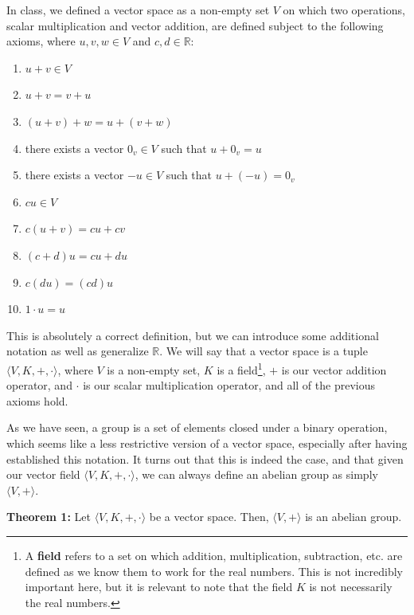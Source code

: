 \documentclass[twoside]{article}
\newcommand{\R}{\mathbb{R}}
\begin{document}
\begin{spacing}{1.25}
In class, we defined a vector space as a non-empty set $V$ on which two operations,
scalar multiplication and vector addition, are defined subject to the following axioms,
where $u,v,w \in V$ and $c,d \in \R$:
\begin{enumerate}
    \item $u+v \in V$
    \item $u+v = v+u$
    \item $(u+v)+w = u+(v+w)$
    \item there exists a vector $0_v \in V$ such that $u+0_v = u$
    \item there exists a vector $-u \in V$ such that $u+(-u) = 0_v$
    \item $cu\in V$
    \item $c(u+v) = cu+cv$
    \item $(c+d)u = cu+du$
    \item $c(du) = (cd)u$
    \item $1 \cdot u = u$
\end{enumerate}
This is absolutely a correct definition, but we can introduce some additional 
notation as well as generalize $\R$. We will say that a vector space is a tuple 
$\langle V, K, +, \cdot \rangle$, where $V$ is a non-empty set, $K$ is a field\footnote[2]{A \textbf{field} refers to a set on which addition, multiplication, subtraction, etc. are defined as we know them to work for the real numbers. This is not incredibly important here, but it is relevant to note that the field $K$ is not necessarily the real numbers.},
$+$ is our vector addition operator, and $\cdot$ is our scalar multiplication operator,
and all of the previous axioms hold.

As we have seen, a group is a set of elements closed under a binary operation, which 
seems like a less restrictive version of a vector space, especially after having 
established this notation. It turns out that this is indeed the case, and that 
given our vector field $\langle V, K, +, \cdot \rangle$, we can always define 
an abelian group as simply $\langle V, + \rangle$.

\begin{mdframed}[roundcorner=10pt, backgroundcolor=gray!10]
  \textbf{Theorem 1:} Let $\langle V, K, +, \cdot \rangle$ be a vector space. Then,
  $\langle V, + \rangle$ is an abelian group.
\end{mdframed}


\end{spacing}
\end{document}
